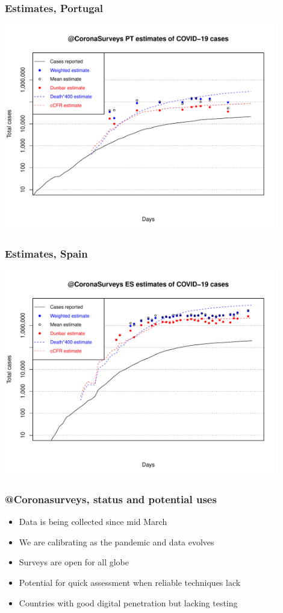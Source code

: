 \documentclass{beamer}
\begin{document}
\begin{frame}
  \frametitle{Estimates, Portugal}
  \begin{center}
  \includegraphics[width=0.9\textwidth]{PTEst2.pdf}
  \end{center}
\end{frame}

\begin{frame}
  \frametitle{Estimates, Spain}
  \begin{center}
  \includegraphics[width=0.9\textwidth]{ESEst2.pdf}
  \end{center}
\end{frame}

\begin{frame}
  \frametitle{@Coronasurveys, status and potential uses}
  \begin{itemize}
    \item Data is being collected since mid March
    \item We are calibrating as the pandemic and data evolves
    \item Surveys are open for all globe
    
  \end{itemize}
  \begin{itemize}
    \item Potential for quick assessment when reliable techniques lack 
    \item Countries with good digital penetration but lacking testing
  \end{itemize}

\end{frame}
\end{document}
